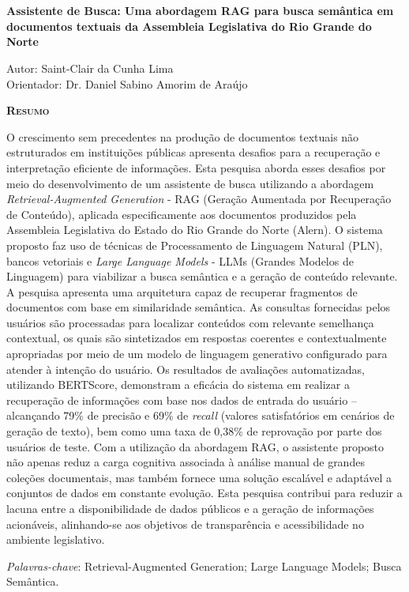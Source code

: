 \chapter*{}
\begin{center}
	{
	\Large{
	    \textbf{Assistente de Busca: Uma abordagem RAG para busca semântica em documentos textuais da Assembleia Legislativa do Rio Grande do Norte}
	    }
	}
\end{center}

\vspace{1cm}

\begin{flushright}
	Autor: Saint-Clair da Cunha Lima \\
	Orientador: Dr. Daniel Sabino Amorim de Araújo
\end{flushright}

\vspace{1cm}

\begin{center}
	\Large{\textsc{\textbf{Resumo}}}
\end{center}

\noindent 
O crescimento sem precedentes na produção de documentos textuais não estruturados em instituições públicas apresenta desafios para a recuperação e interpretação eficiente de informações. Esta pesquisa aborda esses desafios por meio do desenvolvimento de um assistente de busca utilizando a abordagem \textit{Retrieval-Augmented Generation} - RAG (Geração Aumentada por Recuperação de Conteúdo), aplicada especificamente aos documentos produzidos pela Assembleia Legislativa do Estado do Rio Grande do Norte (Alern). O sistema proposto faz uso de técnicas de Processamento de Linguagem Natural (PLN), bancos vetoriais e \textit{Large Language Models} - LLMs (Grandes Modelos de Linguagem) para viabilizar a busca semântica e a geração de conteúdo relevante.
A pesquisa apresenta uma arquitetura capaz de recuperar fragmentos de documentos com base em similaridade semântica. As consultas fornecidas pelos usuários são processadas para localizar conteúdos com relevante semelhança contextual, os quais são sintetizados em respostas coerentes e contextualmente apropriadas por meio de um modelo de linguagem generativo configurado para atender à intenção do usuário.
Os resultados de avaliações automatizadas, utilizando BERTScore, demonstram a eficácia do sistema em realizar a recuperação de informações com base nos dados de entrada do usuário -- alcançando 79\% de precisão e 69\% de \textit{recall} (valores satisfatórios em cenários de geração de texto), bem como uma taxa de 0,38\% de reprovação por parte dos usuários de teste. Com a utilização da abordagem RAG, o assistente proposto não apenas reduz a carga cognitiva associada à análise manual de grandes coleções documentais, mas também fornece uma solução escalável e adaptável a conjuntos de dados em constante evolução. Esta pesquisa contribui para reduzir a lacuna entre a disponibilidade de dados públicos e a geração de informações acionáveis, alinhando-se aos objetivos de transparência e acessibilidade no ambiente legislativo.


\noindent\textit{Palavras-chave}: Retrieval-Augmented Generation; Large Language Models; Busca Semântica.




